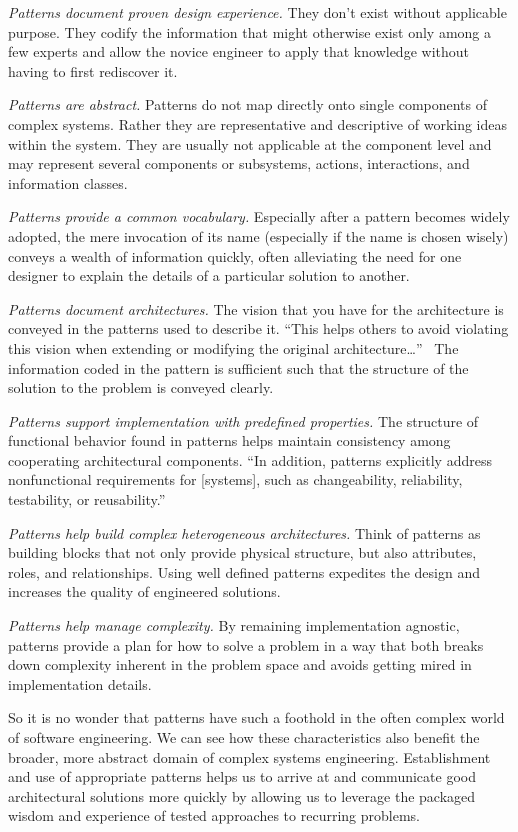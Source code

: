 \documentclass[jou,apacite]{apa6}
\begin{document}
\emph{Patterns document proven design experience.}  They don't exist without applicable purpose.  They codify the information that might otherwise exist only among a few experts and allow the novice engineer to apply that knowledge without having to first rediscover it.

\emph{Patterns are abstract.}  Patterns do not map directly onto single components of complex systems. Rather they are representative and descriptive of working ideas within the system.  They are usually not applicable at the component level and may represent several components or subsystems, actions, interactions, and information classes.

\emph{Patterns provide a common vocabulary.}  Especially after a pattern becomes widely adopted, the mere invocation of its name (especially if the name is chosen wisely) conveys a wealth of information quickly, often alleviating the need for one designer to explain the details of a particular solution to another.

\emph{Patterns document architectures.} The vision that you have for the architecture is conveyed in the patterns used to describe it.  ``This helps others to avoid violating this vision when extending or modifying the original architecture\dots''~\cite[page 6]{Buschmann}  The information coded in the pattern is sufficient such that the structure of the solution to the problem is conveyed clearly.

\emph{Patterns support implementation with predefined properties.}  The structure of functional behavior found in patterns helps maintain consistency among cooperating architectural components.  ``In addition, patterns explicitly address nonfunctional requirements for [systems], such as changeability, reliability, testability, or reusability.''~\cite[page 7]{Buschmann}

\emph{Patterns help build complex heterogeneous architectures.}  Think of patterns as building blocks that not only provide physical structure, but also attributes, roles, and relationships.  Using well defined patterns expedites the design and increases the quality of engineered solutions.  

\emph{Patterns help manage complexity.}  By remaining implementation agnostic, patterns provide a plan for how to solve a problem in a way that both breaks down complexity inherent in the problem space and avoids getting mired in implementation details.

So it is no wonder that patterns have such a foothold in the often complex world of software engineering.  We can see how these characteristics also benefit the broader, more abstract domain of complex systems engineering.  Establishment and use of appropriate patterns helps us to arrive at and communicate good architectural solutions more quickly by allowing us to leverage the packaged wisdom and experience of tested approaches to recurring problems.
\end{document}
